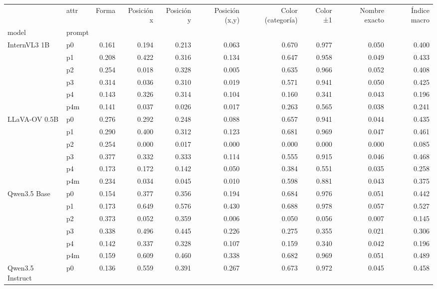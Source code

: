\begin{tabular}{llrrrrrrrr}
\toprule
 & attr & Forma & Posición x & Posición y & Posición (x,y) & Color (categoría) & Color ±1 & Nombre exacto & Índice macro \\
model & prompt &  &  &  &  &  &  &  &  \\
\midrule
\multirow[t]{6}{*}{InternVL3 1B} & p0 & 0.161 & 0.194 & 0.213 & 0.063 & 0.670 & 0.977 & 0.050 & 0.400 \\
 & p1 & 0.208 & 0.422 & 0.316 & 0.134 & 0.647 & 0.958 & 0.049 & 0.433 \\
 & p2 & 0.254 & 0.018 & 0.328 & 0.005 & 0.635 & 0.966 & 0.052 & 0.408 \\
 & p3 & 0.314 & 0.036 & 0.310 & 0.019 & 0.571 & 0.941 & 0.050 & 0.425 \\
 & p4 & 0.143 & 0.326 & 0.314 & 0.104 & 0.160 & 0.341 & 0.043 & 0.196 \\
 & p4m & 0.141 & 0.037 & 0.026 & 0.017 & 0.263 & 0.565 & 0.038 & 0.241 \\
\cline{1-10}
\multirow[t]{6}{*}{LLaVA-OV 0.5B} & p0 & 0.276 & 0.292 & 0.248 & 0.088 & 0.657 & 0.941 & 0.044 & 0.435 \\
 & p1 & 0.290 & 0.400 & 0.312 & 0.123 & 0.681 & 0.969 & 0.047 & 0.461 \\
 & p2 & 0.254 & 0.000 & 0.017 & 0.000 & 0.000 & 0.000 & 0.000 & 0.085 \\
 & p3 & 0.377 & 0.332 & 0.333 & 0.114 & 0.555 & 0.915 & 0.046 & 0.468 \\
 & p4 & 0.173 & 0.172 & 0.142 & 0.050 & 0.384 & 0.551 & 0.035 & 0.258 \\
 & p4m & 0.234 & 0.034 & 0.045 & 0.010 & 0.598 & 0.881 & 0.043 & 0.375 \\
\cline{1-10}
\multirow[t]{6}{*}{Qwen3.5 Base} & p0 & 0.154 & 0.377 & 0.356 & 0.194 & 0.684 & 0.976 & 0.051 & 0.442 \\
 & p1 & 0.173 & 0.649 & 0.576 & 0.430 & 0.688 & 0.978 & 0.057 & 0.527 \\
 & p2 & 0.373 & 0.052 & 0.359 & 0.006 & 0.050 & 0.056 & 0.007 & 0.145 \\
 & p3 & 0.338 & 0.496 & 0.445 & 0.226 & 0.275 & 0.355 & 0.021 & 0.306 \\
 & p4 & 0.142 & 0.337 & 0.328 & 0.107 & 0.159 & 0.340 & 0.042 & 0.196 \\
 & p4m & 0.159 & 0.609 & 0.460 & 0.338 & 0.682 & 0.969 & 0.051 & 0.489 \\
\cline{1-10}
\multirow[t]{6}{*}{Qwen3.5 Instruct} & p0 & 0.136 & 0.559 & 0.391 & 0.267 & 0.673 & 0.972 & 0.045 & 0.458 \\

\end{tabular}
